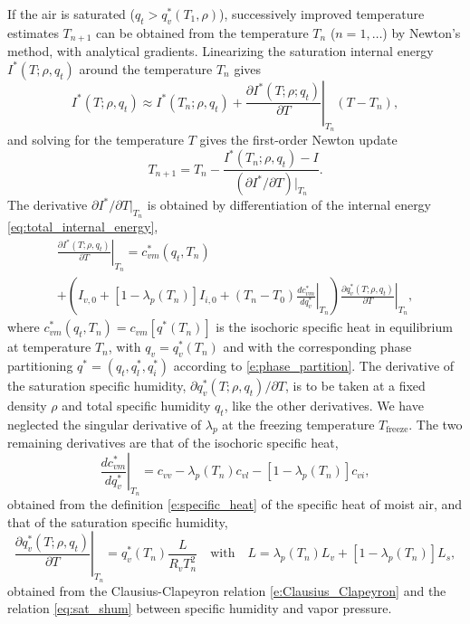 \documentclass{report}
\begin{document}
If the air is saturated ($q_t > q_v^*(T_1, \rho)$), successively improved temperature estimates $T_{n+1}$ can be obtained from the temperature $T_n$ ($n=1,\dots$) by Newton's method, with analytical gradients. Linearizing the saturation internal energy $I^*(T; \rho, q_t)$ around the temperature $T_n$ gives
\begin{equation}
    I^*(T; \rho, q_t) \approx I^*(T_n; \rho, q_t) + \left.\frac{\partial I^*(T; \rho; q_t)}{\partial T}\right|_{T_n} (T - T_n),
\end{equation}
and solving for the temperature $T$ gives the first-order Newton update
\begin{equation}
    T_{n+1} = T_{n} - \frac{I^*(T_{n}; \rho, q_t) - I}{(\partial I^*/\partial T)|_{T_{n}}}.
\end{equation}
The derivative $\partial I^*/\partial T|_{T_n}$ is obtained by differentiation of the internal energy \eqref{eq:total_internal_energy},
\begin{multline}
     \left.\frac{\partial I^*(T; \rho, q_t)}{\partial T}\right|_{T_n} 
     = c_{vm}^*(q_t, T_n) \\
     +  \left( I_{v,0} + [1-\lambda_p(T_n)]I_{i,0} + (T_n - T_0) \left. \frac{dc_{vm}^*}{dq_v^*}\right|_{T_n} \right) \left. \frac{\partial q_v^*(T; \rho, q_t)}{\partial T}\right|_{T_n},
\end{multline}
where $c_{vm}^*(q_t, T_n) = c_{vm}[q^*(T_n)]$ is the isochoric specific heat in equilibrium at temperature $T_n$, with $q_v = q_v^*(T_n)$ and with the corresponding phase partitioning $q^* = (q_t, q_l^*, q_i^*)$ according to \eqref{e:phase_partition}. The derivative of the saturation specific humidity, $\partial q_v^*(T;\rho, q_t)/\partial T$, is to be taken at a fixed density $\rho$ and total specific humidity $q_t$, like the other derivatives. We have neglected the singular derivative of $\lambda_p$ at the freezing temperature $T_{\mathrm{freeze}}$. The two remaining derivatives are that of the isochoric specific heat,
\begin{equation}
    \left. \frac{dc_{vm}^*}{dq_v^*}\right|_{T_n} = c_{vv} - \lambda_p(T_n) c_{vl} - [1-\lambda_p(T_n)]c_{vi},
\end{equation}
obtained from the definition \eqref{e:specific_heat} of the specific heat of moist air, and that of the saturation specific humidity,
\begin{equation}
    \left. \frac{\partial q_v^*(T; \rho, q_t)}{\partial T}\right|_{T_n} = q_v^*(T_n) \frac{L}{R_v T_n^2} \quad \text{with} \quad L = \lambda_p(T_n) L_v + [1-\lambda_p(T_n)] L_s,
\end{equation}
obtained from the Clausius-Clapeyron relation \eqref{e:Clausius_Clapeyron} and the relation \eqref{eq:sat_shum} between specific humidity and vapor pressure. 
\end{document}
